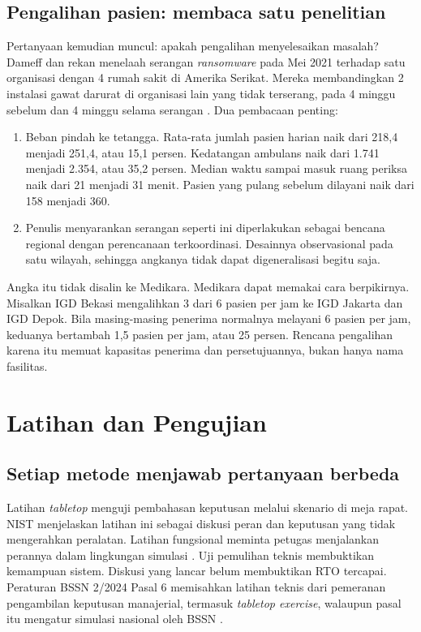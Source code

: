 \subsection*{Pengalihan pasien: membaca satu penelitian}

Pertanyaan kemudian muncul: apakah pengalihan menyelesaikan masalah? Dameff dan rekan menelaah
serangan \textit{ransomware} pada Mei 2021 terhadap satu organisasi dengan 4 rumah sakit di Amerika
Serikat. Mereka membandingkan 2 instalasi gawat darurat di organisasi lain yang tidak terserang,
pada 4 minggu sebelum dan 4 minggu selama serangan \cite{c10-dameff2023}. Dua pembacaan penting:
\begin{enumerate}
  \item Beban pindah ke tetangga. Rata-rata jumlah pasien harian naik dari 218,4 menjadi 251,4, atau
  15,1 persen. Kedatangan ambulans naik dari 1.741 menjadi 2.354, atau 35,2 persen. Median waktu
  sampai masuk ruang periksa naik dari 21 menjadi 31 menit. Pasien yang pulang sebelum dilayani naik
  dari 158 menjadi 360.
  \item Penulis menyarankan serangan seperti ini diperlakukan sebagai bencana regional dengan
  perencanaan terkoordinasi. Desainnya observasional pada satu wilayah, sehingga angkanya tidak
  dapat digeneralisasi begitu saja.
\end{enumerate}

Angka itu tidak disalin ke Medikara. Medikara dapat memakai cara berpikirnya. Misalkan IGD Bekasi
mengalihkan 3 dari 6 pasien per jam ke IGD Jakarta dan IGD Depok. Bila masing-masing penerima
normalnya melayani 6 pasien per jam, keduanya bertambah 1,5 pasien per jam, atau 25 persen. Rencana
pengalihan karena itu memuat kapasitas penerima dan persetujuannya, bukan hanya nama fasilitas.

\section{Latihan dan Pengujian}

\subsection*{Setiap metode menjawab pertanyaan berbeda}

Latihan \textit{tabletop} menguji pembahasan keputusan melalui skenario di meja rapat. NIST
menjelaskan latihan ini sebagai diskusi peran dan keputusan yang tidak mengerahkan peralatan.
Latihan fungsional meminta petugas menjalankan perannya dalam lingkungan simulasi
\cite{c10-nist80034}. Uji pemulihan teknis membuktikan kemampuan sistem. Diskusi yang lancar belum
membuktikan RTO tercapai. Peraturan BSSN 2/2024 Pasal 6 memisahkan latihan teknis dari pemeranan
pengambilan keputusan manajerial, termasuk \textit{tabletop exercise}, walaupun pasal itu mengatur
simulasi nasional oleh BSSN \cite{c10-bssn2-2024}.

